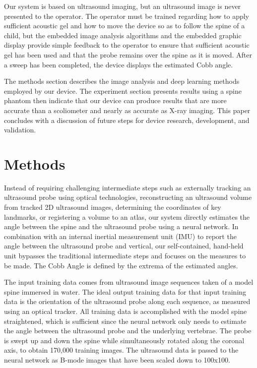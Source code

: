 \documentclass{article}
\begin{document}
Our system is based on ultrasound imaging, but an ultrasound image is never presented to the operator.  The operator must be trained regarding how to apply sufficient acoustic gel and how to move the device so as to follow the spine of a child, but the embedded image analysis algorithms and the embedded graphic display provide simple feedback to the operator to ensure that sufficient acoustic gel has been used and that the probe remains over the spine as it is moved.  After a sweep has been completed, the device displays the estimated Cobb angle.

The methods section describes the image analysis and deep learning methods employed by our device.  The experiment section presents results using a spine phantom then indicate that our device can produce results that are more accurate than a scoliometer and nearly as accurate as X-ray imaging.  This paper concludes with a discussion of future steps for device research, development, and validation.

\section{Methods}
\label{sec:methods}

Instead of requiring challenging intermediate steps such as externally tracking an ultrasound probe using optical technologies, reconstructing an ultrasound volume from tracked 2D ultrasound images, determining the coordinates of key landmarks, or registering a volume to an atlas, our system directly estimates the angle between the spine and the ultrasound probe using a neural network. In combination with an internal inertial measurement unit (IMU) to report the angle between the ultrasound probe and vertical, our self-contained, hand-held unit bypasses the traditional intermediate steps and focuses on the measures to be made. The Cobb Angle is defined by the extrema of the estimated angles.

The input training data comes from ultrasound image sequences taken of a model spine immersed in water. The ideal output training data for that input training data is the orientation of the ultrasound probe along each sequence, as measured using an optical tracker.  All training data is accomplished with the model spine straightened, which is sufficient since the neural network only needs to estimate the angle between the ultrasound probe and the underlying vertebrae. The probe is swept up and down the spine while simultaneously rotated along the coronal axis, to obtain 170,000 training images. The ultrasound data is passed to the neural network as B-mode images that have been scaled down to 100x100.
\end{document}
